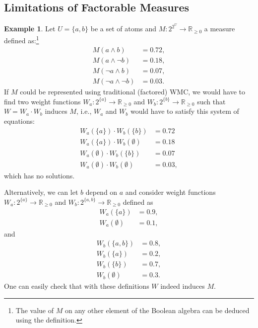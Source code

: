 \documentclass{article}
\theoremstyle{definition}
\newtheorem{example}{Example}
\theoremstyle{remark}
\begin{document}
\subsection{Limitations of Factorable Measures}


\begin{example}
  Let $U = \{a, b\}$ be a set of atoms and $M\colon 2^{2^U} \to \mathbb{R}_{\ge
    0}$ a measure defined as:\footnote{The value of $M$ on any other element of
    the Boolean algebra can be deduced using the definition.}
  \begin{align*}
    M(a \land b) &= 0.72, \\
    M(a \land \neg b) &= 0.18, \\
    M(\neg a \land b) &= 0.07, \\
    M(\neg a \land \neg b) &= 0.03.
  \end{align*}
  If $M$ could be represented using traditional (factored) WMC, we would have to
  find two weight functions $W_a\colon 2^{\{a\}} \to \mathbb{R}_{\ge 0}$ and
  $W_b\colon 2^{\{b\}} \to \mathbb{R}_{\ge 0}$ such that $W = W_a \cdot W_b$
  induces $M$, i.e., $W_a$ and $W_b$ would have to satisfy this system of
  equations:
  \begin{align*}
    W_a(\{a\}) \cdot W_b(\{b\}) &= 0.72 \\
    W_a(\{a\}) \cdot W_b(\emptyset) &= 0.18 \\
    W_a(\emptyset) \cdot W_b(\{b\}) &= 0.07 \\
    W_a(\emptyset) \cdot W_b(\emptyset) &= 0.03,
  \end{align*}
  which has no solutions.

  Alternatively, we can let $b$ depend on $a$ and consider weight functions
  $W_a\colon 2^{\{a\}} \to \mathbb{R}_{\ge 0}$ and $W_b\colon 2^{\{a, b\}} \to
  \mathbb{R}_{\ge 0}$ defined as
  \begin{align*}
    W_a(\{a\}) &= 0.9, \\
    W_a(\emptyset) &= 0.1,
  \end{align*}
  and
  \begin{align*}
    W_b(\{a, b\}) &= 0.8, \\
    W_b(\{a\}) &= 0.2, \\
    W_b(\{b\}) &= 0.7, \\
    W_b(\emptyset) &= 0.3.
  \end{align*}
  One can easily check that with these definitions $W$ indeed induces $M$.
\end{example}
\end{document}
